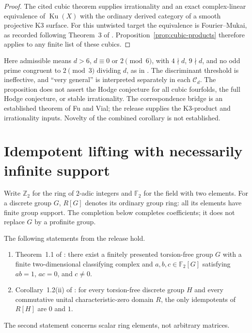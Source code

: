 \begin{proof}
The cited cubic theorem supplies irrationality and an exact complex-linear
equivalence of $\operatorname{Ku}(X)$ with the ordinary derived category
of a smooth projective K3 surface.  For this untwisted target the equivalence
is Fourier--Mukai, as recorded following Theorem~3 of \cite{fuvial}.
Proposition~\ref{prop:cubic-products} therefore applies to any finite list
of these cubics.
\end{proof}

\begin{remark}
Here admissible means $d>6$, $d\equiv 0$ or $2\pmod 6$, with $4\nmid d$,
$9\nmid d$, and no odd prime congruent to $2\pmod 3$ dividing $d$, as in
\cite{cubic}.  The discriminant threshold is ineffective, and ``very
general'' is interpreted separately in each $\mathcal C_d$.  The proposition
does not assert the Hodge conjecture for all cubic fourfolds, the full Hodge
conjecture, or stable irrationality.  The correspondence bridge is an
established theorem of Fu and Vial; the release supplies the K3-product and
irrationality inputs.  Novelty of the combined corollary is not established.
\end{remark}

\section{Idempotent lifting with necessarily infinite support}
\label{sec:adic-support}

Write $\mathbb Z_2$ for the ring of $2$-adic integers and
$\mathbb F_2$ for the field with two elements.  For a discrete group $G$,
$R[G]$ denotes its ordinary group ring: all its elements have finite group
support.  The completion below completes coefficients; it does not replace
$G$ by a profinite group.

\begin{assumption}
\label{ass:group-rings}
The following statements from the release hold.
\begin{enumerate}
\item Theorem~1.1 of \cite{group2}: there exist a finitely presented
      torsion-free group $G$ with a finite two-dimensional classifying
      complex and $a,b,c\in\mathbb F_2[G]$ satisfying
      $ab=1$, $ac=0$, and $c\neq 0$.
\item Corollary~1.2(ii) of \cite{idempotent}: for every torsion-free
      discrete group $H$ and every commutative unital characteristic-zero
      domain $R$, the only idempotents of $R[H]$ are $0$ and $1$.
\end{enumerate}
The second statement concerns scalar ring elements, not arbitrary matrices.
\end{assumption}

